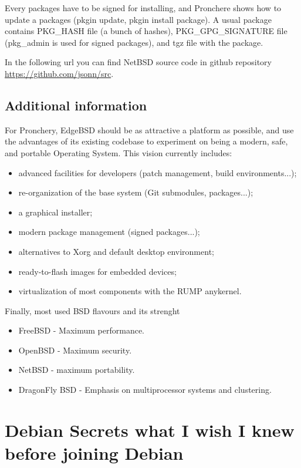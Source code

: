 \documentclass[11pt]{article}
\begin{document}
Every packages have to be signed for installing, and Pronchere shows how to update a packages (pkgin update, pkgin install package). A usual package contains PKG\_HASH file (a bunch of hashes), PKG\_GPG\_SIGNATURE file (pkg\_admin is used for signed packages), and tgz file with the package.

In the following url you can find NetBSD source code in github repository \url{https://github.com/jsonn/src}.

\subsection{Additional information}
For Pronchery, EdgeBSD should be as attractive a platform as possible, and use the advantages of its existing codebase to experiment on being a modern, safe, and portable Operating System. This vision currently includes:
\begin{itemize}
    \item advanced facilities for developers (patch management, build environments...);
    \item re-organization of the base system (Git submodules, packages...);
    \item a graphical installer;
    \item modern package management (signed packages...);
    \item alternatives to Xorg and default desktop environment;
    \item ready-to-flash images for embedded devices;
    \item virtualization of most components with the RUMP anykernel.
\end{itemize}

Finally, most used BSD flavours and its strenght
\begin{itemize}
	\item FreeBSD - Maximum performance.
	\item OpenBSD - Maximum security.
	\item NetBSD - maximum portability.
	\item DragonFly BSD - Emphasis on multiprocessor systems and clustering.
\end{itemize}

\newpage

\section{Debian Secrets what I wish I knew before joining Debian}
\end{document}
